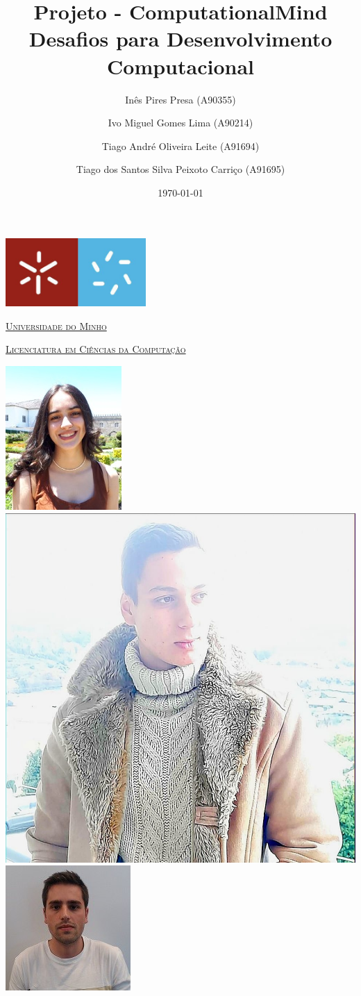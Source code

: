 \documentclass[11pt,a4paper]{report}
\title{Projeto - ComputationalMind\\ Desafios para Desenvolvimento  Computacional} %
\author{Inês Pires Presa (A90355)\and Ivo Miguel Gomes Lima (A90214)\and Tiago André Oliveira Leite (A91694)\and Tiago dos Santos Silva Peixoto Carriço (A91695)} %
\date{\today} %
\begin{document}
	\begin{minipage}{0.9\linewidth}
        \centering
		\includegraphics[width=0.4\textwidth]{um.jpeg}\par\vspace{1cm}
                \href{https://www.uminho.pt/PT}
		{\scshape\LARGE Universidade do Minho} \par
		\vspace{0.6cm}
                \href{https://lcc.di.uminho.pt}
		{\scshape\Large Licenciatura em Ciências da Computação} \par
		\maketitle
		\begin{center}
			\includegraphics[width=0.24\linewidth]{ines.jpg}\hfill
			\includegraphics[width=0.30\linewidth]{ivo.jpg}\hfill
			\includegraphics[width=0.30\linewidth]{tiago1.jpg}\hfill
		\end{center}
		
	\end{minipage}
\end{document}
